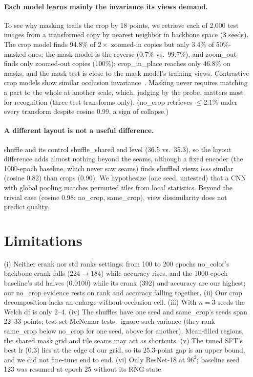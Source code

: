 \documentclass[10pt,twocolumn,letterpaper]{article}
\begin{document}
\paragraph{Each model learns mainly the invariance its views demand.}
To see why masking trails the crop by 18 points, we retrieve each of 2,000 test images from a transformed copy by nearest neighbor in backbone space (3 seeds).
The crop model finds 94.8\% of $2\times$ zoomed-in copies but only 3.4\% of 50\%-masked ones; the mask model is the reverse (0.7\% vs.\ 99.7\%), and zoom\_out finds only zoomed-out copies (100\%); crop\_in\_place reaches only 46.8\% on masks, and the mask test is close to the mask model's training views. Contrastive crop models show similar occlusion invariance~\cite{purushwalkam2020demystifying}.
Masking never requires matching a part to the whole at another scale, which, judging by the probe, matters most for recognition (three test transforms only).
(no\_crop retrieves $\le$2.1\% under every transform despite cosine 0.99, a sign of collapse.)

\paragraph{A different layout is not a useful difference.}
shuffle and its control shuffle\_shared end level (36.5 vs.\ 35.3), so the layout difference adds almost nothing beyond the seams, although a fixed encoder (the 1000-epoch baseline, which never saw seams) finds shuffled views \emph{less} similar (cosine 0.82) than crops (0.90). We hypothesize (one seed, untested) that a CNN with global pooling matches permuted tiles from local statistics. Beyond the trivial case (cosine 0.98: no\_crop, same\_crop), view dissimilarity does not predict quality.


\section{Limitations}
\label{sec:limitations}

(i) Neither erank nor std ranks settings: from 100 to 200 epochs no\_color's backbone erank falls ($224\to184$) while accuracy rises, and the 1000-epoch baseline's std halves (0.0100) while its erank (392) and accuracy are our highest; our no\_crop evidence rests on rank and accuracy falling together.
(ii) Our crop decomposition lacks an enlarge-without-occlusion cell.
(iii) With $n{=}3$ seeds the Welch df is only 2--4.
(iv) The shuffles have one seed and same\_crop's seeds span 22--33 points; test-set McNemar tests~\cite{mcnemar1947} ignore such variance (they rank same\_crop below no\_crop for one seed, above for another). Mean-filled regions, the shared mask grid and tile seams may act as shortcuts.
(v) The tuned SFT's best lr (0.3) lies at the edge of our grid, so its 25.3-point gap is an upper bound, and we did not fine-tune end to end.
(vi) Only ResNet-18 at $96^2$; baseline seed 123 was resumed at epoch 25 without its RNG state.
\end{document}
